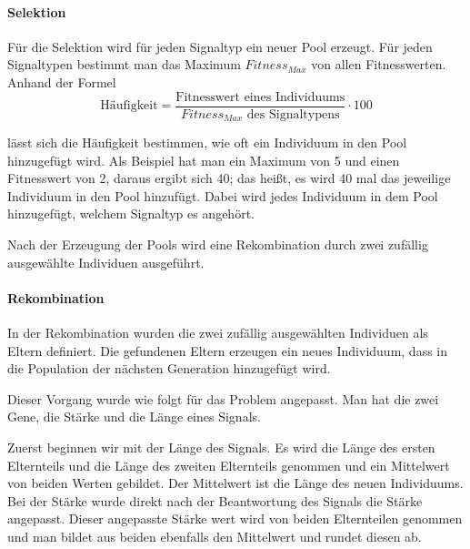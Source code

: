 \paragraph{Selektion}
F{\"u}r die Selektion wird f{\"u}r jeden Signaltyp ein neuer Pool erzeugt. 
F{\"u}r jeden Signaltypen bestimmt man das Maximum $Fitness_{Max}$ von allen Fitnesswerten.
Anhand der Formel 
\begin{equation}
  \text{H{\"a}ufigkeit} = \frac {\text{Fitnesswert eines Individuums}} {\text{$Fitness_{Max}$ des Signaltypens}}\cdot 100
\end{equation}

l{\"a}sst sich die H{\"a}ufigkeit bestimmen, wie oft ein Individuum in den Pool hinzugef{\"u}gt wird. Als Beispiel hat man ein Maximum von 5 und einen Fitnesswert von 2, daraus ergibt sich 40; das hei{\ss}t, es wird 40 mal das jeweilige Individuum in den Pool hinzuf{\"u}gt. Dabei wird jedes Individuum in dem Pool hinzugef{\"u}gt, welchem Signaltyp es angeh{\"o}rt. 

Nach der Erzeugung der Pools wird eine Rekombination durch zwei zuf{\"a}llig ausgew{\"a}hlte Individuen ausgef{\"u}hrt.


\paragraph{Rekombination}
In der Rekombination wurden die zwei zuf{\"a}llig ausgew{\"a}hlten Individuen als Eltern definiert. Die gefundenen Eltern erzeugen ein neues Individuum, dass in die Population der n{\"a}chsten Generation hinzugef{\"u}gt wird. 

Dieser Vorgang wurde wie folgt f{\"u}r das Problem angepasst. Man hat die zwei Gene, die St{\"a}rke und die L{\"a}nge eines Signals.

Zuerst beginnen wir mit der L{\"a}nge des Signals. Es wird die L{\"a}nge des ersten Elternteils und die L{\"a}nge des zweiten Elternteils genommen und ein Mittelwert von beiden Werten gebildet. Der Mittelwert ist die L{\"a}nge des neuen Individuums.
Bei der St{\"a}rke wurde direkt nach der Beantwortung des Signals die St{\"a}rke angepasst. Dieser angepasste St{\"a}rke wert wird von beiden Elternteilen genommen und man bildet aus beiden ebenfalls den Mittelwert und rundet diesen ab.

